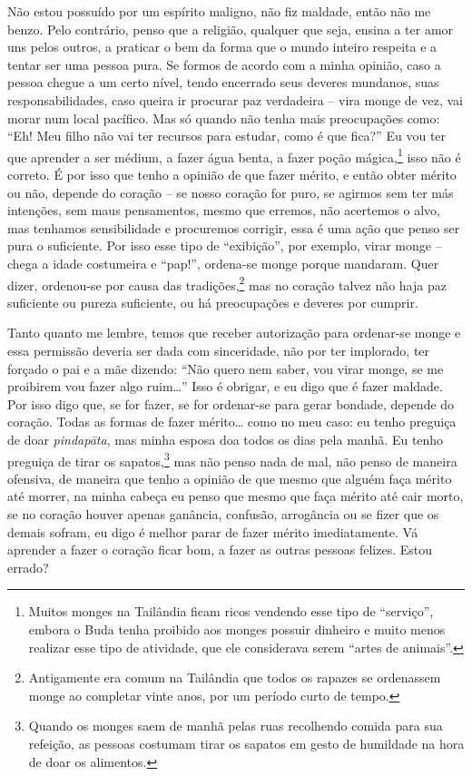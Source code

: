 Não estou possuído por um espírito maligno, não fiz maldade, então
não me benzo. Pelo contrário, penso que a religião, qualquer que seja,
ensina a ter amor uns pelos outros, a praticar o bem da forma que o
mundo inteiro respeita e a tentar ser uma pessoa pura. Se formos de
acordo com a minha opinião, caso a pessoa chegue a um certo nível,
tendo encerrado seus deveres mundanos, suas responsabilidades, caso
queira ir procurar paz verdadeira – vira monge de vez, vai morar num
local pacífico. Mas só quando não tenha mais preocupações como: “Eh!
Meu filho não vai ter recursos para estudar, como é que fica?” Eu vou
ter que aprender a ser médium, a fazer água benta, a fazer poção
mágica,\footnote{Muitos monges na Tailândia ficam ricos vendendo esse
tipo de “serviço”, embora o Buda tenha proibido aos monges possuir
dinheiro e muito menos realizar esse tipo de atividade, que ele
considerava serem “artes de animais”.} isso não é correto. É por isso
que tenho a opinião de que fazer mérito, e então obter mérito ou não,
depende do coração – se nosso coração for puro, se agirmos sem ter más
intenções, sem maus pensamentos, mesmo que erremos, não acertemos o
alvo, mas tenhamos sensibilidade e procuremos corrigir, essa é uma ação
que penso ser pura o suficiente. Por isso esse tipo de “exibição”, por
exemplo, virar monge – chega a idade costumeira e “pap!”, ordena-se
monge porque mandaram. Quer dizer, ordenou-se por causa das
tradições,\footnote{Antigamente era comum na Tailândia que todos os
rapazes se ordenassem monge ao completar vinte anos, por um período
curto de tempo.} mas no coração talvez não haja paz suficiente ou
pureza suficiente, ou há preocupações e deveres por cumprir. 

Tanto quanto me lembre, temos que receber autorização para
ordenar-se monge e essa permissão deveria ser dada com sinceridade, não
por ter implorado, ter forçado o pai e a mãe dizendo: “Não quero nem
saber, vou virar monge, se me proibirem vou fazer algo ruim…” Isso é
obrigar, e eu digo que é fazer maldade. Por isso digo que, se for
fazer, se for ordenar-se para gerar bondade, depende do coração. Todas
as formas de fazer mérito… como no meu caso: eu tenho preguiça de doar
\textit{pindapāta}, mas minha esposa doa todos os dias pela manhã. Eu
tenho preguiça de tirar os sapatos,\footnote{Quando os monges saem de
manhã pelas ruas recolhendo comida para sua refeição, as pessoas
costumam tirar os sapatos em gesto de humildade na hora de doar os
alimentos.} mas não penso nada de mal, não penso de maneira ofensiva,
de maneira que tenho a opinião de que mesmo que alguém faça mérito até
morrer, na minha cabeça eu penso que mesmo que faça mérito até cair
morto, se no coração houver apenas ganância, confusão, arrogância ou se
fizer que os demais sofram, eu digo é melhor parar de fazer mérito
imediatamente. Vá aprender a fazer o coração ficar bom, a fazer as
outras pessoas felizes. Estou errado?

